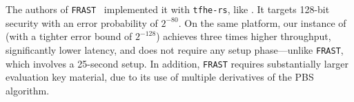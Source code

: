 The authors of \texttt{FRAST}~\cite{FRAST} implemented it with \texttt{tfhe-rs}, like \coolName. It targets 128-bit security with an error probability of $2^{-80}$. On the same platform, our instance of \coolName (with a tighter error bound of $2^{-128}$) achieves three times higher throughput, significantly lower latency, and does not require any setup phase—unlike \texttt{FRAST}, which involves a 25-second setup. In addition, \texttt{FRAST} requires substantially larger evaluation key material, due to its use of multiple derivatives of the PBS algorithm. %





